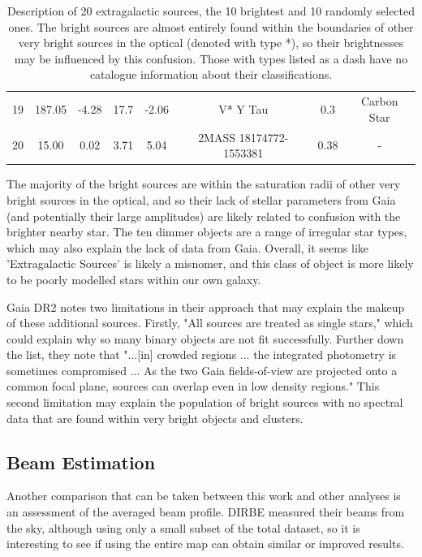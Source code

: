 \documentclass{aa}
\begin{document}
\begin{table}
\begin{tabular}{l c c c c c c c}
	 19 & 187.05 & -4.28 & 17.7 & -2.06 & V* Y Tau & 0.3 & Carbon Star\\
	 20 & 15.00 & 0.02 & 3.71 & 5.04 & 2MASS 18174772-1553381 & 0.38 & - \\
     \hline
    \end{tabular}
    \caption{Description of 20 extragalactic sources, the 10 brightest and 10 randomly selected ones. The bright sources are almost entirely found within the boundaries of other very bright sources in the optical (denoted with type *), so their brightnesses may be influenced by this confusion. Those with types listed as a dash have no catalogue information about their classifications.}
    \label{tab:exgal}
\end{table}

The majority of the bright sources are within the saturation radii of other very bright sources in the optical, and so their lack of stellar parameters from Gaia (and potentially their large amplitudes) are likely related to confusion with the brighter nearby star. The ten dimmer objects are a range of irregular star types, which may also explain the lack of data from Gaia. Overall, it seems like 'Extragalactic Sources' is likely a misnomer, and this class of object is more likely to be poorly modelled stars within our own galaxy.

Gaia DR2 notes two limitations in their approach that may explain the makeup of these additional sources. Firstly, "All sources are treated as single stars," which could explain why so many binary objects are not fit successfully. Further down the list, they note that "...[in] crowded regions ... the integrated photometry is sometimes compromised ... As the two Gaia fields-of-view are projected onto a common focal plane, sources can overlap even in low density regions." \citep{gaiaClassification} This second limitation may explain the population of bright sources with no spectral data that are found within very bright objects and clusters.

\subsection{Beam Estimation}

Another comparison that can be taken between this work and other analyses is an assessment of the averaged beam profile. DIRBE measured their beams from the sky, although using only a small subset of the total dataset, so it is interesting to see if using the entire map can obtain similar or improved results.
\end{document}
